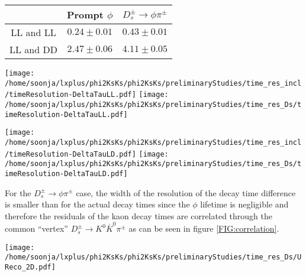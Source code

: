 \begin{center}
\begin{tabular}{c|cc}
 & Prompt $\phi$ & $D_s^\pm \rightarrow \phi \pi^\pm$ \\ 
\hline 
LL and LL & $0.24 \pm 0.01$ & $0.43 \pm 0.01$ \\ 
LL and DD & $2.47 \pm 0.06$ & $4.11 \pm 0.05$ \\ 
\end{tabular} 
 \label{TAB:whatever}
\end{center}


\begin{center}
\texttt{[image: /home/soonja/lxplus/phi2KsKs/phi2KsKs/preliminaryStudies/time\_res\_incl/timeResolution-DeltaTauLL.pdf]}
\texttt{[image: /home/soonja/lxplus/phi2KsKs/phi2KsKs/preliminaryStudies/time\_res\_Ds/timeResolution-DeltaTauLL.pdf]}
\label{FIG:LL-diff}
\end{center}


\begin{center}
\texttt{[image: /home/soonja/lxplus/phi2KsKs/phi2KsKs/preliminaryStudies/time\_res\_incl/timeResolution-DeltaTauLD.pdf]}
\texttt{[image: /home/soonja/lxplus/phi2KsKs/phi2KsKs/preliminaryStudies/time\_res\_Ds/timeResolution-DeltaTauLD.pdf]}
\label{FIG:LD-diff}
\end{center}

For the $D_s^\pm \rightarrow \phi \pi^\pm$ case, the width of the resolution of the decay time difference is smaller than for the actual decay times since the $\phi$ lifetime is negligible and therefore the residuals of the kaon decay times are correlated through the common ``vertex'' $D_s^\pm \rightarrow K^0 \overline{K}^0 \pi^\pm$ as can be seen in figure \ref{FIG:correlation}.

\begin{center}
\texttt{[image: /home/soonja/lxplus/phi2KsKs/phi2KsKs/preliminaryStudies/time\_res\_Ds/UReco\_2D.pdf]}
\label{FIG:correlation}
\end{center}



